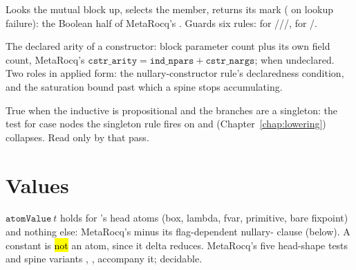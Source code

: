 \begin{definition}
\label{def:isPropositionalInductive}
\leanok
{}
 Looks the mutual block up, selects the member, returns its  mark ( on lookup failure): the Boolean half of MetaRocq's . Guards six rules:  for ///,  for /.
\end{definition}

\begin{definition}
\label{def:constructorArity}
\leanok
{}
 The declared arity of a constructor: block parameter count plus its own field count, MetaRocq's $\mathtt{cstr\_arity} = \mathtt{ind\_npars}+\mathtt{cstr\_nargs}$;  when undeclared. Two roles in applied form: the nullary-constructor rule's declaredness condition, and the saturation bound past which a spine stops accumulating.
\end{definition}

\begin{definition}
\label{def:wouldCollapse}
\leanok
{}
 True when the inductive is propositional and the branches are a singleton: the test for case nodes the singleton rule fires on and  (Chapter~\ref{chap:lowering}) collapses. Read only by that pass.
\end{definition}

\section{Values}
\label{sec:lambdabox:values}

\begin{definition}
\label{def:atomValue}
\leanok
{}
 $\mathtt{atomValue}\ t$ holds for \lbox{}'s head atoms (box, lambda, fvar, primitive, bare fixpoint) and nothing else: MetaRocq's  minus its flag-dependent nullary- clause (below). A constant is \hl{not} an atom, since it delta reduces.
 MetaRocq's five head-shape tests and spine variants , ,  accompany it; decidable.
\end{definition}

